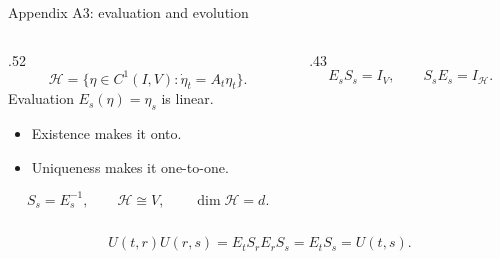 \begin{frame}[t]{Appendix A3: evaluation and evolution}
\hypertarget{app:evaluation}{}
\begin{columns}[T,onlytextwidth]
  \begin{column}{.52\textwidth}
    \begin{equation*}
      \mathcal H=\{\eta\in C^1(I,V):\dot\eta_t=A_t\eta_t\}.
    \end{equation*}
    Evaluation $E_s(\eta)=\eta_s$ is linear.
    \begin{itemize}\setlength{\itemsep}{4pt}
      \item Existence makes it onto.
      \item Uniqueness makes it one-to-one.
    \end{itemize}
    \begin{equation*}
      S_s=E_s^{-1},\qquad \mathcal H\cong V,
      \qquad\dim\mathcal H=d.
    \end{equation*}
  \end{column}
  \begin{column}{.43\textwidth}
    \begin{equation*}
      E_sS_s=I_V,\qquad S_sE_s=I_{\mathcal H}.
    \end{equation*}
  \end{column}
\end{columns}
\begin{equation*}
  U(t,r)U(r,s)=E_tS_rE_rS_s=E_tS_s=U(t,s).
\end{equation*}
\end{frame}

